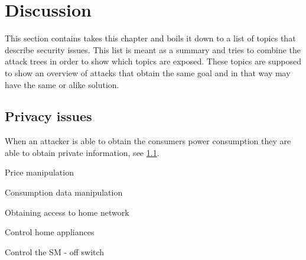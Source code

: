 \section{Discussion}
This section contains takes this chapter and boils it down to a list of topics that describe security issues.
This list is meant as a summary and tries to combine the attack trees in order to show which topics are exposed.
These topics are supposed to show an overview of attacks that obtain the same goal and in that way may have the same or alike solution.





\subsection{Privacy issues}
When an attacker is able to obtain the consumers power consumption they are able to obtain private information, see \cref{}.



Price manipulation


Consumption data manipulation


Obtaining access to home network


Control home appliances


Control the SM
- off switch
